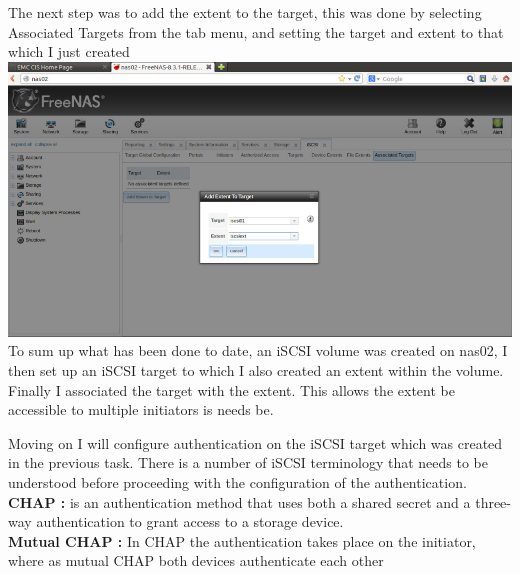 The next step was to add the extent to the target, this was done by selecting Associated Targets from the tab menu, and setting the target and extent to that which I just created
\\\includegraphics[width=\textwidth]{11.png}
To sum up what has been done to date, an iSCSI volume was created on nas02, I then set up an iSCSI target to which I also created an extent within the volume. Finally I associated the target with the extent. This allows the extent be accessible to multiple initiators is needs be. 


Moving on I will configure authentication on the iSCSI target which was created in the previous task.
There is a number of iSCSI terminology that needs to be understood before proceeding with the configuration of the authentication. 
\\\textbf{CHAP :} is an authentication method that uses both a shared secret and a three-way authentication to grant access to a storage device.
\\\textbf{Mutual CHAP : } In CHAP the authentication takes place on the initiator, where as mutual CHAP both devices authenticate each other \cite{CHAP}

